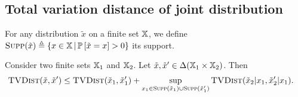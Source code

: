 \subsection{Total variation distance of joint distribution}

For any distribution $\tilde x$ on a finite set $\mathbb X$,
we define $\textsc{Supp}(\tilde x) \triangleq \left\lbrace x \in \mathbb X \,\middle|\, \mathbb P\left[\tilde x = x\right] > 0 \right\rbrace$
its support.

\begin{lemma}
    \label{lemma:joint-distribution}
    Consider two finite sets $\mathbb X_1$ and $\mathbb X_2$.
    Let $\tilde x, \tilde x' \in \Delta(\mathbb X_1 \times \mathbb X_2)$.
    Then 
    \begin{align}
        \textsc{TVDist} (\tilde x, \tilde x') 
        &\leq \textsc{TVDist} (\tilde x_1, \tilde x_1') 
        + \sup_{x_1 \in \textsc{Supp}(\tilde x_1) \cup \textsc{Supp}(\tilde x_1')} 
            \textsc{TVDist} (\tilde x_2 | x_1, \tilde x_2' | x_1).
    \end{align}
\end{lemma}

